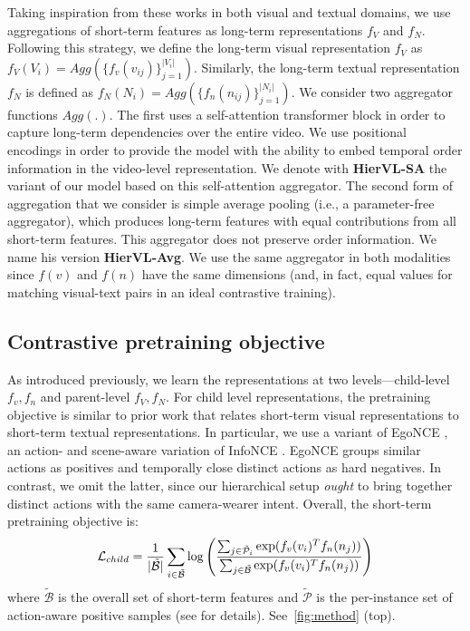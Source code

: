 \documentclass[10pt,twocolumn,letterpaper]{article}
\begin{document}
Taking inspiration from these works in both visual and textual domains, we use aggregations of short-term features as long-term representations $f_V$ and $f_N$. Following this strategy, we define the long-term visual representation $f_V$ as $f_V(V_i) = Agg\left(\{f_v(v_{ij})\}_{j=1}^{|V_i|}\right)$. Similarly, the long-term textual representation $f_N$ is defined as $f_N(N_i) = Agg\left(\{f_n(n_{ij})\}_{j=1}^{|N_i|}\right)$. We consider two aggregator functions $Agg(.)$. The first uses a self-attention transformer block in order to capture long-term dependencies over the entire video. We use positional encodings in order to provide the model with the ability to embed temporal order information in the video-level representation. We denote with \textbf{HierVL-SA} the variant of our model based on this self-attention aggregator. The second form of aggregation that we consider is simple average pooling (i.e., a parameter-free aggregator), which produces long-term features with equal contributions from all short-term features. This aggregator does not preserve order information. We name his version \textbf{HierVL-Avg}. We use the same aggregator in both modalities since $f(v)$ and $f(n)$ have the same dimensions (and, in fact, equal values for matching visual-text pairs in an ideal contrastive training).








\subsection{Contrastive pretraining objective}
\label{contrastive}

As introduced previously, we learn the representations at two levels---child-level $f_v, f_n$ and parent-level $f_V, f_N$. For child level representations, the pretraining objective is similar to prior work \cite{howto100m,egovlp,mil-nce,videoclip} that relates short-term visual representations to short-term textual representations. In particular, we use a variant of EgoNCE \cite{egovlp}, an action- and scene-aware variation of InfoNCE \cite{infonce}. EgoNCE groups similar actions as positives and temporally close distinct actions as hard negatives. In contrast, we omit the latter, since our hierarchical setup \emph{ought} to bring together distinct actions with the same camera-wearer intent. 
  Overall, the short-term pretraining objective is:
$$\mathcal{L}_{child} = \frac{1}{|\Tilde{\mathcal{B}}|} \sum_{i \in \tilde{\mathcal{B}}} \log \left(\frac{\sum_{j \in \mathcal{\tilde{P}}_i} \text{exp}({f_v(v_i)^Tf_n(n_j)})}{ \sum_{j \in \tilde{\mathcal{B}}} \text{exp}(f_v(v_i)^Tf_n(n_j))}\right)$$
where $\mathcal{\tilde{B}}$ is the overall set of short-term features and $\mathcal{\tilde{P}}$ is the per-instance set of action-aware positive samples (see \cite{egovlp} for details).  See~\cref{fig:method} (top). 
\end{document}

